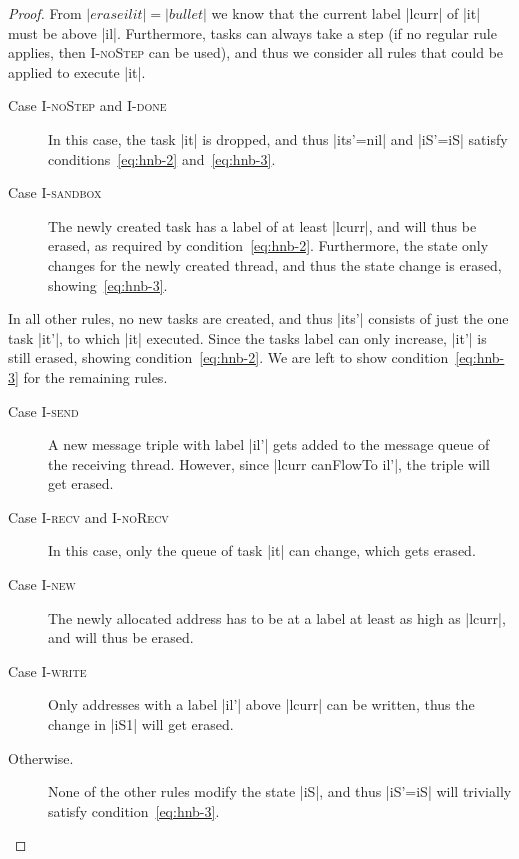 \begin{proof}
  From $|erase il it|=|bullet|$ we know that the current label |lcurr| of |it|
  must be above |il|.  Furthermore, tasks can always take a step (if no
  regular rule applies, then \textsc{I-noStep} can be used), and thus
  we consider all rules that could be applied to execute |it|.
  \begin{description}
    \item[Case \textsc{I-noStep} and \textsc{I-done}]
    In this case, the task |it| is dropped,
    and thus |its'=nil| and |iS'=iS| satisfy
    conditions~\eqref{eq:hnb-2} and~\eqref{eq:hnb-3}.
    \item[Case \textsc{I-sandbox}]
    The newly created task has a label of at least |lcurr|, and will thus be
    erased, as required by condition~\eqref{eq:hnb-2}.  Furthermore, the
    state only changes for the newly created thread, and thus the state
    change is erased, showing~\eqref{eq:hnb-3}.
  \end{description}
  In all other rules, no new tasks are created, and thus |its'| consists of just
  the one task |it'|, to which |it| executed.  Since the tasks label can
  only increase, |it'| is still erased, showing condition~\eqref{eq:hnb-2}.
  We are left to show condition~\eqref{eq:hnb-3} for the remaining rules.
  \begin{description}
    \item[Case \textsc{I-send}]
    A new message triple with label |il'| gets added to the message
    queue of the receiving thread.  However, since |lcurr canFlowTo il'|,
    the triple will get erased.
    \item[Case \textsc{I-recv} and \textsc{I-noRecv}]
    In this case, only the queue of
    task |it| can change, which gets erased.
    \item[Case \textsc{I-new}] The newly allocated address has to be at a
    label at least as high as |lcurr|, and will thus be erased.
    \item[Case \textsc{I-write}] Only addresses with a label |il'| above
    |lcurr| can be written, thus the change in |iS1| will get erased.
    \item[Otherwise.]  None of the other rules modify the state |iS|, and
    thus |iS'=iS| will trivially satisfy condition~\eqref{eq:hnb-3}.
  \end{description}
\end{proof}


